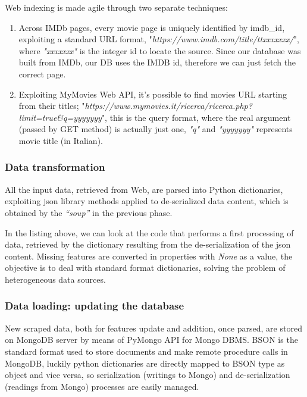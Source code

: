 \documentclass[11pt]{article}
\begin{document}
Web indexing is made agile through two separate techniques:

\begin{enumerate}
    \item Across IMDb pages, every movie page is uniquely identified by imdb\_id, exploiting a standard URL format, "\emph{https://www.imdb.com/title/ttxxxxxxx/}", where \emph{"xxxxxxx"} is the integer id to locate the source. Since our database was built from IMDb, our DB uses the IMDB id, therefore we can just fetch the correct page.
    \item Exploiting MyMovies Web API, it's possible to find movies URL starting from their titles; "\emph{https://www.mymovies.it/ricerca/ricerca.php?limit=true\&q=yyyyyyy}", this is the query format, where the real argument (passed by GET method) is actually just one, \emph{"q"} and \emph{"yyyyyyy"} represents movie title (in Italian).
\end{enumerate}
\subsubsection{Data transformation}
All the input data, retrieved from Web, are parsed into Python dictionaries, exploiting json library methods applied to de-serialized data content, which is obtained by the \emph{``soup''} in the previous phase.


In the listing above, we can look at the code that performs a first processing of data, retrieved by the dictionary resulting from the de-serialization of the json content. Missing features are converted in properties with \emph{None} as a value, the objective is to deal with standard format dictionaries, solving the problem of heterogeneous data sources.

\subsubsection{Data loading: updating the database}
New scraped data, both for features update and addition, once parsed, are stored on MongoDB server by means of PyMongo API for Mongo DBMS. BSON is the standard format used to store documents and make remote procedure calls in MongoDB, luckily python dictionaries are directly mapped to BSON type as object and vice versa, so serialization (writings to Mongo) and de-serialization (readings from Mongo) processes are easily managed.
\end{document}
